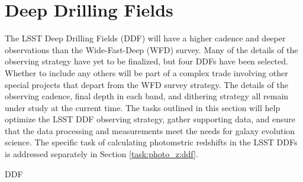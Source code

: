 \section{Deep Drilling Fields}\label{sec:tasks:ddf}  

{\justify
The LSST Deep Drilling Fields (DDF) will have a higher cadence and deeper observations than the Wide-Fast-Deep (WFD) survey.
Many of the details of the observing strategy have yet to be finalized, but four DDFs have been selected.
Whether to include any others will be part of a complex trade involving other special projects that depart from the WFD survey strategy. The details of the observing cadence, final depth in each band, and dithering strategy all remain  under study at the current time. 
The tasks outlined in this section will help optimize the LSST DDF
observing strategy, gather supporting data, and ensure that the data processing and measurements meet the needs for galaxy evolution science.
The specific task of calculating photometric redshifts in the LSST DDFs is addressed separately in Section \ref{task:photo_z:ddf}.

\begin{tasklist}{DDF}


\end{tasklist}}
